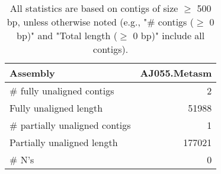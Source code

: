 \documentclass[12pt,a4paper]{article}
\begin{document}
\begin{table}[ht]
\begin{center}
\caption{All statistics are based on contigs of size $\geq$ 500 bp, unless otherwise noted (e.g., "\# contigs ($\geq$ 0 bp)" and "Total length ($\geq$ 0 bp)" include all contigs).}
\begin{tabular}{|l*{1}{|r}|}
\hline
Assembly & AJ055.Metasm \\ \hline
\# fully unaligned contigs & 2 \\ \hline
Fully unaligned length & 51988 \\ \hline
\# partially unaligned contigs & 1 \\ \hline
Partially unaligned length & 177021 \\ \hline
\# N's & 0 \\ \hline
\end{tabular}
\end{center}
\end{table}
\end{document}
